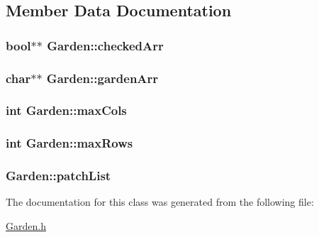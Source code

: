 \subsection{Member Data Documentation}
\hypertarget{class_garden_ae370405ce67afc5e08b33462dc157ca0}{
\subsubsection[{checked\-Arr}]{\setlength{\rightskip}{0pt plus 5cm}bool$\ast$$\ast$ Garden\-::checked\-Arr}}\label{class_garden_ae370405ce67afc5e08b33462dc157ca0}
\hypertarget{class_garden_aa13f03bd07377e5740947041ec717051}{
\subsubsection[{garden\-Arr}]{\setlength{\rightskip}{0pt plus 5cm}char$\ast$$\ast$ Garden\-::garden\-Arr}}\label{class_garden_aa13f03bd07377e5740947041ec717051}
\hypertarget{class_garden_a5b875de93ef430b149f490d4e5272ae1}{
\subsubsection[{max\-Cols}]{\setlength{\rightskip}{0pt plus 5cm}int Garden\-::max\-Cols}}\label{class_garden_a5b875de93ef430b149f490d4e5272ae1}
\hypertarget{class_garden_adb64bd58fc94fc700ce160a0cd593109}{
\subsubsection[{max\-Rows}]{\setlength{\rightskip}{0pt plus 5cm}int Garden\-::max\-Rows}}\label{class_garden_adb64bd58fc94fc700ce160a0cd593109}
\hypertarget{class_garden_a059e09ed3387ab07585fda476e8fc692}{
\subsubsection[{patch\-List}]{ Garden\-::patch\-List}}\label{class_garden_a059e09ed3387ab07585fda476e8fc692}


The documentation for this class was generated from the following file\-:\begin{DoxyCompactItemize}
\item 
\hyperlink{_garden_8h}{Garden.\-h}\end{DoxyCompactItemize}
